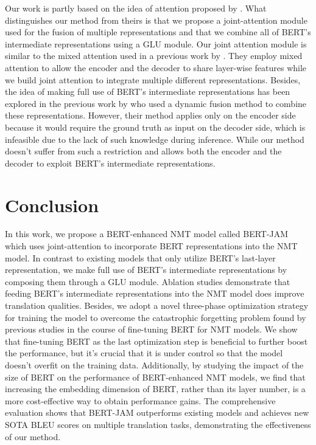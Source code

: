 \documentclass[review]{elsarticle}
\begin{document}
Our work is partly based on the idea of attention proposed by \citet{Zhu20}. What distinguishes our method from theirs is that we propose a joint-attention module used for the fusion of multiple representations and that we combine all of BERT's intermediate representations using a GLU module. 
Our joint attention module is similar to the mixed attention used in a previous work by \citet{He18}.
They employ mixed attention to allow the encoder and the decoder to share layer-wise features while we build joint attention to integrate multiple different representations.
Besides, the idea of making full use of BERT's intermediate representations has been explored in the previous work by \citet{Weng20} who used a dynamic fusion method to combine these representations. However, their method applies only on the encoder side because it would require the ground truth as input on the decoder side, which is infeasible due to the lack of such knowledge during inference. While our method doesn't suffer from such a restriction and allows both the encoder and the decoder to exploit BERT's intermediate representations.

\section{Conclusion}
\label{sec:conclusion}
In this work, we propose a BERT-enhanced NMT model called BERT-JAM which uses joint-attention to incorporate BERT representations into the NMT model. In contrast to existing models that only utilize BERT's last-layer representation, we make full use of BERT's intermediate representations by composing them through a GLU module. Ablation studies demonstrate that feeding BERT's intermediate representations into the NMT model does improve translation qualities. 
Besides, we adopt a novel three-phase optimization strategy for training the model to overcome the catastrophic forgetting problem found by previous studies in the course of fine-tuning BERT for NMT models. We show that fine-tuning BERT as the last optimization step is beneficial to further boost the performance, but it's crucial that it is under control so that the model doesn't overfit on the training data.
Additionally, by studying the impact of the size of BERT on the performance of BERT-enhanced NMT models, we find that increasing the embedding dimension of BERT, rather than its layer number, is a more cost-effective way to obtain performance gains.
The comprehensive evaluation shows that BERT-JAM outperforms existing models and achieves new SOTA BLEU scores on multiple translation tasks, demonstrating the effectiveness of our method. 
\end{document}
